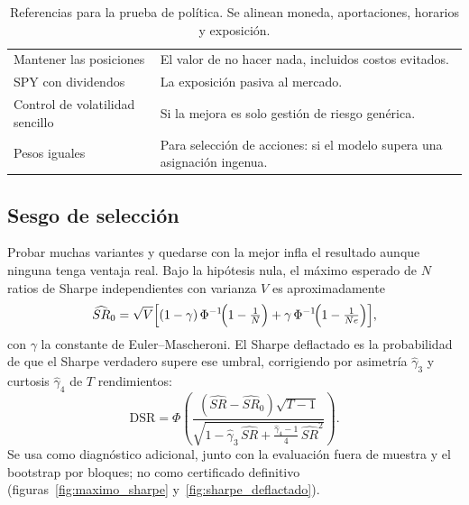\begin{table}[H]
\centering\small
\caption{Referencias para la prueba de política. Se alinean moneda, aportaciones, horarios y exposición.}
\label{tab:referencias}
\begin{tabularx}{\linewidth}{@{}l Y@{}}
\toprule
{} & \\
\midrule
Mantener las posiciones & El valor de no hacer nada, incluidos costos evitados.\\
SPY con dividendos & La exposición pasiva al mercado.\\
Control de volatilidad sencillo & Si la mejora es solo gestión de riesgo genérica.\\
Pesos iguales & Para selección de acciones: si el modelo supera una asignación ingenua.\\
\bottomrule
\end{tabularx}
\end{table}

\subsection{Sesgo de selección}\label{sec:seleccion}

Probar muchas variantes y quedarse con la mejor infla el resultado aunque ninguna tenga ventaja real. Bajo
la hipótesis nula, el máximo esperado de $N$ ratios de Sharpe independientes con varianza $V$ es
aproximadamente \citep{bailey2014}
\begin{equation}
\widehat{SR}_0=\sqrt{V}\Bigl[(1-\gamma)\,\Phi^{-1}\!\Bigl(1-\tfrac1N\Bigr)+\gamma\,\Phi^{-1}\!\Bigl(1-\tfrac{1}{Ne}\Bigr)\Bigr],
\label{eq:sr0}
\end{equation}
con $\gamma$ la constante de Euler--Mascheroni. El Sharpe deflactado es la probabilidad de que el Sharpe
verdadero supere ese umbral, corrigiendo por asimetría $\hat\gamma_3$ y curtosis $\hat\gamma_4$ de $T$
rendimientos:
\begin{equation}
\mathrm{DSR}=\Phi\!\left(\frac{(\widehat{SR}-\widehat{SR}_0)\sqrt{T-1}}{\sqrt{1-\hat\gamma_3\,\widehat{SR}+\frac{\hat\gamma_4-1}{4}\,\widehat{SR}^2}}\right).
\label{eq:dsr}
\end{equation}
Se usa como diagnóstico adicional, junto con la evaluación fuera de muestra y el bootstrap por bloques; no
como certificado definitivo (figuras~\ref{fig:maximo_sharpe} y~\ref{fig:sharpe_deflactado}).


